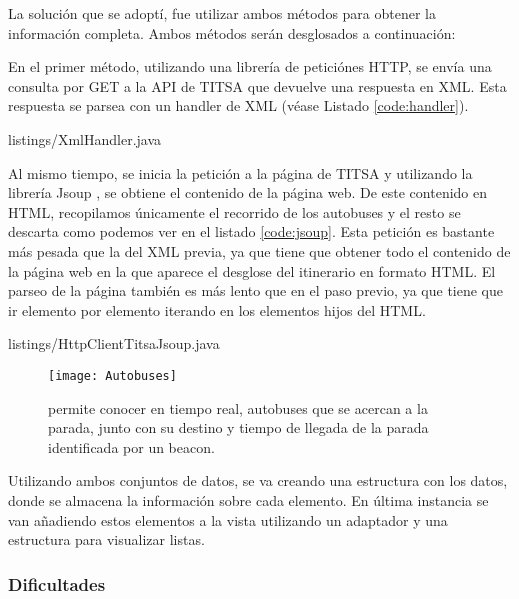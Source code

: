 La solución que se adoptí, fue utilizar ambos métodos para obtener la información completa. Ambos métodos serán desglosados a continuación: 


En el primer método, utilizando una librería de peticiónes HTTP, se envía una consulta por GET a la API de TITSA que devuelve una respuesta en XML. Esta respuesta se parsea con un handler de XML (véase Listado \ref{code:handler}). 


{listings/XmlHandler.java} %

Al mismo tiempo, se inicia la petición a la página de TITSA y utilizando la librería Jsoup \cite{URL::Jsoup}, se obtiene el contenido de la página web. De este contenido en HTML, recopilamos únicamente el recorrido de los autobuses y el resto se descarta como podemos ver en el listado \ref{code:jsoup}. Esta petición es bastante más pesada que la del XML previa, ya que tiene que obtener todo el contenido de la página web en la que aparece el desglose del itinerario en formato HTML. El parseo de la página también es más lento que en el paso previo, ya que tiene que ir elemento por elemento iterando en los elementos hijos del HTML.


{listings/HttpClientTitsaJsoup.java} %

\begin{figure}[H]
	\centering
	\texttt{[image: Autobuses]}
	\caption{\BulletPoint{} permite conocer en tiempo real, autobuses que se acercan a la parada, junto con su destino y tiempo de llegada de la parada identificada por un beacon.}
	\label{fig:autobuses}
\end{figure}

Utilizando ambos conjuntos de datos, se va creando una estructura con los datos, donde se almacena la información sobre cada elemento. En última instancia se van añadiendo estos elementos a la vista utilizando un adaptador y una estructura para visualizar listas.


\subsubsection{Dificultades}



